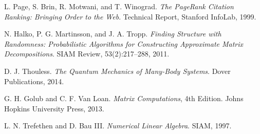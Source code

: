 \documentclass[11pt,a4paper]{article}
\begin{document}
\begin{thebibliography}{9}

L. Page, S. Brin, R. Motwani, and T. Winograd.
\textit{The PageRank Citation Ranking: Bringing Order to the Web}.
Technical Report, Stanford InfoLab, 1999.

N. Halko, P. G. Martinsson, and J. A. Tropp.
\textit{Finding Structure with Randomness: Probabilistic Algorithms for Constructing Approximate Matrix Decompositions}.
SIAM Review, 53(2):217--288, 2011.

D. J. Thouless.
\textit{The Quantum Mechanics of Many-Body Systems}.
Dover Publications, 2014.

G. H. Golub and C. F. Van Loan.
\textit{Matrix Computations}, 4th Edition.
Johns Hopkins University Press, 2013.

L. N. Trefethen and D. Bau III.
\textit{Numerical Linear Algebra}.
SIAM, 1997.

\end{thebibliography}
\end{document}
